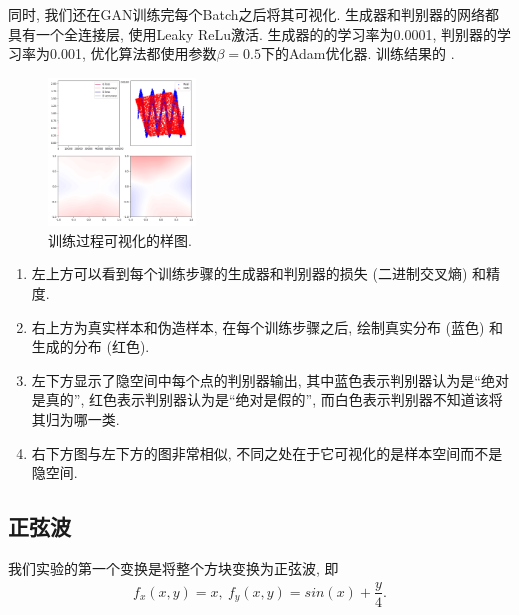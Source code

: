\documentclass[lang=cn,11pt]{elegantpaper}
\begin{document}
同时, 我们还在GAN训练完每个Batch之后将其可视化. 生成器和判别器的网络都具有一个全连接层, 使用Leaky ReLu激活. 生成器的的学习率为0.0001, 判别器的学习率为0.001, 优化算法都使用参数$\beta=0.5$下的Adam优化器. 训练结果的 . 
\begin{figure}[htbp]
  \centering
    \includegraphics[width=0.35\textwidth]{sin_2_1}
    \caption{训练过程可视化的样图. \label{fig:f1}}
  \end{figure}

\begin{enumerate}
	\item 左上方可以看到每个训练步骤的生成器和判别器的损失 (二进制交叉熵) 和精度.
	\item 右上方为真实样本和伪造样本, 在每个训练步骤之后, 绘制真实分布 (蓝色) 和生成的分布 (红色).
	\item 左下方显示了隐空间中每个点的判别器输出, 其中蓝色表示判别器认为是“绝对是真的”, 红色表示判别器认为是“绝对是假的”, 而白色表示判别器不知道该将其归为哪一类. 
	\item 右下方图与左下方的图非常相似, 不同之处在于它可视化的是样本空间而不是隐空间. 
\end{enumerate}

\subsection{正弦波}

我们实验的第一个变换是将整个方块变换为正弦波, 即
\begin{align*}
	f_x(x,y)=x,\ f_y(x,y)=sin(x)+\dfrac{y}{4}.
\end{align*}
\end{document}
